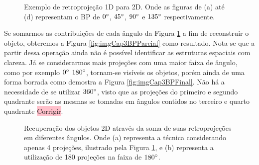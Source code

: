 \begin{figure}[H]
	\centering
	
	\caption{Exemplo de retroprojeção \acs{1D} para \acs{2D}. Onde as figuras de (a) até (d) representam o \acs{BP} de $0\degree$, $45\degree$, $90\degree$ e $135\degree$ respectivamente.}
	
	\hfil
	\hfil
	\hfil
	\hfil
	
	\label{fig:imgCap3BPMosaico}
\end{figure}


Se somarmos as contribuições de cada ângulo da Figura \ref{fig:imgCap3BPMosaico} a fim de reconstruir o objeto, obteremos a Figura \ref{fig:imgCap3BPParcial} como resultado. Nota-se que a partir dessa operação ainda não é possível identificar as estruturas espaciais com clareza. Já se considerarmos mais projeções com uma maior faixa de ângulo, como por exemplo $0\degree$  $180\degree$, tornam-se visíveis os objetos, porém ainda de uma forma borrada como demostra a Figura \ref{fig:imgCap3BPFinal}. Não há a necessidade de se utilizar $360\degree$, visto que as projeções do primeiro e segundo quadrante serão as mesmas se tomadas em ângulos contidos no terceiro e quarto quadrante \colorbox{pink}{Corrigir}.   

\begin{figure}[H]
	\centering
	
	\caption{Recuperação dos objetos \acs{2D} através da soma de suas retroprojeções em diferentes ângulos. Onde (a) representa a técnica considerando apenas 4 projeções, ilustrado pela Figura \ref{fig:imgCap3BPMosaico}, e (b) representa a utilização de 180 projeções na faixa de $180\degree$.}
	
	\hfil
	\hfil
	
	\label{fig:imgCap3BPSoma}
\end{figure}

